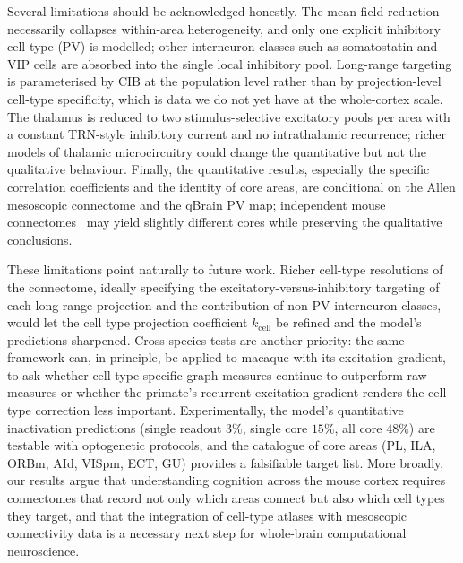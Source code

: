 \documentclass[11pt]{article}
\begin{document}
Several limitations should be acknowledged honestly. The mean-field reduction necessarily collapses within-area heterogeneity, and only one explicit inhibitory cell type (PV) is modelled; other interneuron classes such as somatostatin and VIP cells are absorbed into the single local inhibitory pool. Long-range targeting is parameterised by CIB at the population level rather than by projection-level cell-type specificity, which is data we do not yet have at the whole-cortex scale. The thalamus is reduced to two stimulus-selective excitatory pools per area with a constant TRN-style inhibitory current and no intrathalamic recurrence; richer models of thalamic microcircuitry could change the quantitative but not the qualitative behaviour. Finally, the quantitative results, especially the specific correlation coefficients and the identity of core areas, are conditional on the Allen mesoscopic connectome and the qBrain PV map; independent mouse connectomes~\cite{gamanut2018mouse,knox2018highresolution} may yield slightly different cores while preserving the qualitative conclusions.

These limitations point naturally to future work. Richer cell-type resolutions of the connectome, ideally specifying the excitatory-versus-inhibitory targeting of each long-range projection and the contribution of non-PV interneuron classes, would let the cell type projection coefficient $k_{\text{cell}}$ be refined and the model's predictions sharpened. Cross-species tests are another priority: the same framework can, in principle, be applied to macaque with its excitation gradient, to ask whether cell type-specific graph measures continue to outperform raw measures or whether the primate's recurrent-excitation gradient renders the cell-type correction less important. Experimentally, the model's quantitative inactivation predictions (single readout $3\%$, single core $15\%$, all core $48\%$) are testable with optogenetic protocols, and the catalogue of core areas (PL, ILA, ORBm, AId, VISpm, ECT, GU) provides a falsifiable target list. More broadly, our results argue that understanding cognition across the mouse cortex requires connectomes that record not only which areas connect but also which cell types they target, and that the integration of cell-type atlases with mesoscopic connectivity data is a necessary next step for whole-brain computational neuroscience.



\end{document}

